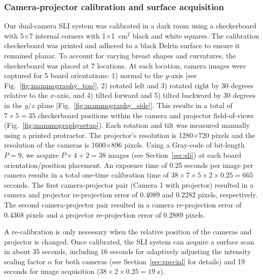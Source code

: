 \subsubsection{Camera-projector calibration and surface acquisition}
\label{ssec:calibrationresults}
Our dual-camera SLI system was calibrated in a dark room using a checkerboard with 5$\times$7 internal corners with 1$\times$1~cm$^2$ black and white squares. The calibration checkerboard was printed and adhered to a black Delrin surface to ensure it remained planar. To account for varying breast shapes and curvatures, the checkerboard was placed at 7 locations. At each location, camera images were captured for 5 board orientations: 1) normal to the $y$-axis [see Fig.~\ref{fig:mammography_top}], 2) rotated left and 3) rotated right by 30 degrees relative to the $x$-axis, and 4) tilted forward and 5) tilted backward by 30 degrees in the $y/z$ plane [Fig.~\ref{fig:mammography_side}]. This results in a total of $7\times5=35$ checkerboard positions within the camera and projector field-of-views (Fig.~\ref{fig:mammographysetup}). Each rotation and tilt was measured manually using a printed protractor. The projector's resolution is 1280$\times$720 pixels and the resolution of the cameras is 1600$\times$896 pixels. Using a Gray-code of bit-length $P=9$, we acquire $P\times 4 + 2 = 38$ images (see Section~\ref{sec:sli}) at each board orientation/position placement. An exposure time of 0.25 seconds per image per camera results in a total one-time calibration time of $38 \times 7 \times 5 \times 2 \times 0.25 = 665$ seconds. The first camera-projector pair (Camera 1 with projector) resulted in a camera and projector re-projection error of 0.4089 and 0.2282 pixels, respectively. The second camera-projector pair resulted in a camera re-projection error of 0.4368 pixels and a projector re-projection error of 0.2889 pixels.

A re-calibration is only necessary when the relative position of the cameras and projector is changed. Once calibrated, the SLI system can acquire a surface scan in about 35 seconds, including 16 seconds for adaptively adjusting the intensity scaling factor $\alpha$ for both cameras (see Section~\ref{sec:special} for details) and 19 seconds for image acquisition ($38 \times 2\times 0.25 = 19$ s).

